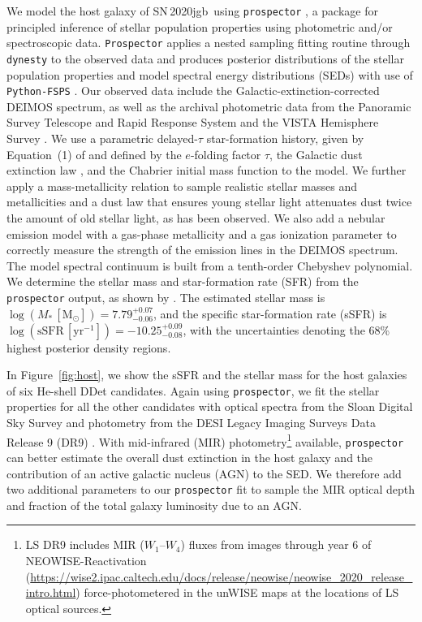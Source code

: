\documentclass[twocolumn]{aastex631}
\newcommand{\sn}{SN\,2020jgb}
\newcommand{\Msun}{\mathrm{M_\odot}}
\begin{document}
We model the host galaxy of \sn\ using \texttt{prospector} \citep{Johnson_prospector_2021}, a package for principled inference of stellar population properties using photometric and/or spectroscopic data. \texttt{Prospector} applies a nested sampling fitting routine through \texttt{dynesty} \citep{Speagle_dynesty_2020} to the observed data and produces posterior distributions of the stellar population properties and model spectral energy distributions (SEDs) with use of \texttt{Python-FSPS} \citep{Conroy_2009,Conroy_2010}. Our observed data include the Galactic-extinction-corrected DEIMOS spectrum, as well as the archival photometric data from the Panoramic Survey Telescope and Rapid Response System \citep[Pan-STARRS;][$g$, $r$, $i$, $z$, $y$ Kron magnitudes]{PS1_2016}  and the VISTA Hemisphere Survey \citep[VHS;][$J$ and $K_s$ Petrosian magnitudes]{VHS_2013}. We use a parametric delayed-$\tau$ star-formation history, given by Equation~(1) of \citet{Nugent_2020} and defined by the $e$-folding factor $\tau$, the Galactic dust extinction law \citep{Cardelli_1989}, and the Chabrier initial mass function \citep{Chabrier_2003} to the model. We further apply a mass-metallicity relation \citep{Gallazzi_2005} to sample realistic stellar masses and metallicities and a dust law that ensures young stellar light attenuates dust twice the amount of old stellar light, as has been observed.  We also add a nebular emission model \citep{Byler_2017} with a gas-phase metallicity and a gas ionization parameter to correctly measure the strength of the emission lines in the DEIMOS spectrum. The model spectral continuum is built from a tenth-order Chebyshev polynomial. We determine the stellar mass and star-formation rate (SFR) from the \texttt{prospector} output, as shown by \citet{Nugent_2022}. The estimated stellar mass is $\log (M_*\,[\Msun])=7.79_{-0.06}^{+0.07}$, and the specific star-formation rate (sSFR) is $\log (\mathrm{sSFR}\,[\mathrm{yr}^{-1}])=-10.25_{-0.08}^{+0.09}$, with the uncertainties denoting the 68\% highest posterior density regions.

In Figure~\ref{fig:host}, we show the sSFR and the stellar mass for the host galaxies of six He-shell DDet candidates. Again using \texttt{prospector}, we fit the stellar properties for all the other candidates with optical spectra from the Sloan Digital Sky Survey \citep[SDSS;][]{York_2000} and photometry from the DESI Legacy Imaging Surveys Data Release 9 (DR9) \citep[LS;][$g$, $r$, $z$, $W_1$, $W_2$, $W_3$, $W_4$ magnitudes]{Dey_2019}. With mid-infrared (MIR) photometry\footnote{LS DR9 includes MIR ($W_1$--$W_4$) fluxes from images through year 6 of NEOWISE-Reactivation (\url{https://wise2.ipac.caltech.edu/docs/release/neowise/neowise_2020_release_intro.html}) force-photometered in the unWISE \citep{Meisner_unwise_2018} maps at the locations of LS optical sources.} available, \texttt{prospector} can better estimate the overall dust extinction in the host galaxy and the contribution of an active galactic nucleus (AGN) to the SED. We therefore add two additional parameters to our \texttt{prospector} fit to sample the MIR optical depth and fraction of the total galaxy luminosity due to an AGN.
\end{document}
